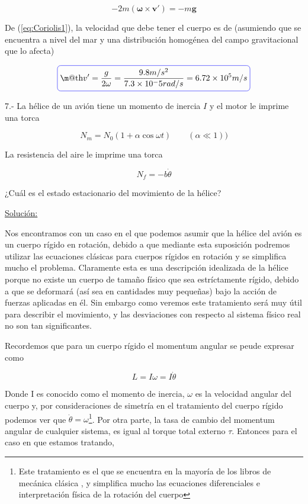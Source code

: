 \documentclass[a4paper,10pt]{article}
\makeatletter
\newcommand*{\boxcolor}{blue}
\renewcommand{\boxed}[1]{\textcolor{\boxcolor}{%
\tikz[baseline={([yshift=-1ex]current bounding box.center)}] \node [rectangle, minimum width=1ex,rounded corners,draw] {\normalcolor\m@th$\displaystyle#1$};}}
\makeatother
\begin{document}
\begin{equation}
 - 2m(\mathbf{\omega} \times \mathbf{v'}) = - m \mathbf{g}
 \label{eq:Coriolis1}
\end{equation}

De (\ref{eq:Coriolis1}), la velocidad que debe tener el cuerpo es de (asumiendo que se encuentra a nivel del mar
y una distribución homogénea del campo gravitacional que lo afecta)

\begin{equation}
 \boxed{ v' = \frac{g}{2\omega} = \frac{9.8 m/s^2}{7.3 \times 10^-5 rad/s} = 6.72 \times 10^5 m/s}
\end{equation}


\vspace{.3cm}

7.- La hélice de un avión tiene un momento de inercia $I$ y el motor le imprime una torca 

$$N_m = N_0 (1+\alpha \cos{\omega t}) \qquad (\alpha \ll 1))$$

La resistencia del aire le imprime una torca

$$N_f = -b\dot{\theta}$$

¿Cuál es el estado estacionario del movimiento de la hélice?

\vspace{.3cm}

\underline{Solución:}

Nos encontramos con un caso en el que podemos asumir que la hélice del avión es un
cuerpo rígido en rotación, debido a que mediante esta suposición podremos utilizar
las ecuaciones clásicas para cuerpos rígidos en rotación y se simplifica mucho el
problema. Claramente esta es una descripción idealizada de la hélice porque no 
existe un cuerpo de tamaño físico que sea estríctamente rígido, debido a que se
deformará (así sea en cantidades muy pequeñas) bajo la acción de fuerzas aplicadas
en él. Sin embargo como veremos este tratamiento será muy útil para describir el
movimiento, y las desviaciones con respecto al sistema físico real no son tan 
significantes.

Recordemos que para un cuerpo rígido el momentum angular se peude expresar como

\begin{equation}
 L = I\omega = I\dot{\theta}
 \label{eq:MomemtumAngCuerpoRig}
\end{equation}

Donde I es conocido como el momento de inercia, $\omega$ es la velocidad angular
del cuerpo y, por consideraciones de simetría en el tratamiento del cuerpo
rígido podemos ver que $\dot{\theta} = \omega$\footnote{Este tratamiento es el que
se encuentra en la mayoría de los libros de mecánica clásica \cite{marion,arya}, y simplifica mucho
las ecuaciones diferenciales e interpretación física de la rotación del cuerpo}. Por
otra parte, la tasa de cambio del momentum angular de cualquier sistema, es igual
al torque total externo $\tau$. Entonces para el caso en que estamos tratando,
\end{document}
